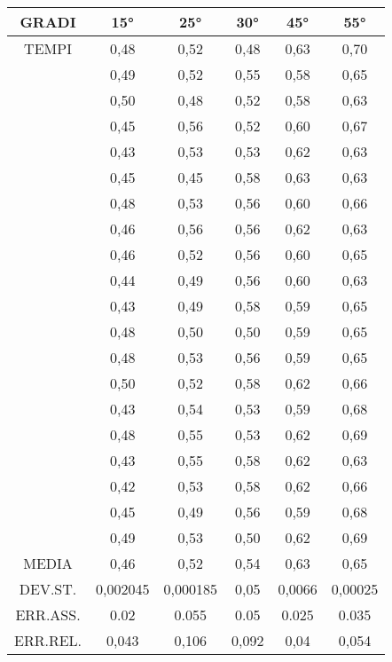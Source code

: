 \documentclass[a4paper, 12pt]{article} %
\begin{document}
\begin{table} [h]
	\begin{center}
	\begin{tabular}{|c|c|c|c|c|c|}
		
	\hline
 GRADI &	15° & 25° & 30° & 45° & 55°\\
	\hline
	TEMPI & 0,48 & 0,52 & 0,48 & 0,63 & 0,70 \\
	\hline
	& 0,49  & 0,52 & 0,55 & 0,58 & 0,65\\
	\hline
&	0,50 & 0,48 & 0,52 & 0,58 & 0,63\\
	\hline
&	0,45 & 0,56 & 0,52 & 0,60 & 0,67\\
	\hline
&	0,43 & 0,53 & 0,53 & 0,62 & 0,63\\
	\hline
&	0,45 & 0,45 & 0,58 & 0,63 & 0,63\\
	\hline
&	0,48 & 0,53 & 0,56 & 0,60 & 0,66\\
	\hline
&	0,46 & 0,56 & 0,56 & 0,62 & 0,63\\
	\hline
&	0,46 & 0,52 & 0,56 & 0,60 & 0,65\\
	\hline
&	0,44 & 0,49 & 0,56 & 0,60 & 0,63\\
	\hline
	& 0,43 & 0,49 & 0,58 & 0,59 & 0,65\\
	\hline
	& 0,48 & 0,50 & 0,50 & 0,59 & 0,65\\
	\hline
	& 0,48 & 0,53 & 0,56 & 0,59 & 0,65\\
	\hline
	&0,50 & 0,52 & 0,58 & 0,62 & 0,66\\
	\hline
	& 0,43 & 0,54 & 0,53 & 0,59 & 0,68\\
	\hline
	& 0,48 & 0,55 & 0,53 & 0,62 & 0,69\\
	\hline
	& 0,43 & 0,55 & 0,58 & 0,62 & 0,63\\
	\hline
	& 0,42 & 0,53 & 0,58 & 0,62 & 0,66\\
	\hline
	& 0,45 & 0,49 & 0,56 & 0,59 & 0,68\\
	\hline
	&0,49 & 0,53 & 0,50 & 0,62 & 0,69\\
	\hline
	MEDIA & 0,46 & 0,52 & 0,54 & 0,63 & 0,65\\
	\hline
	DEV.ST. & 0,002045 & 0,000185 & 0,05 & 0,0066 & 0,00025\\
	\hline
	ERR.ASS. & 0.02 & 0.055 & 0.05 & 0.025 & 0.035\\
	\hline
	ERR.REL. & 0,043 & 0,106 & 0,092 & 0,04 & 0,054\\
	\hline
\end{tabular}
\end{center}
\end{table}
\vfill
\end{document}
